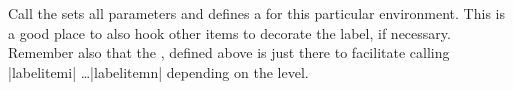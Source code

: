 Call the  sets all parameters and defines a   for this particular
environment. This is a good place to also hook other items to decorate the label, if necessary.
Remember also that the , defined above is just there to facilitate  
calling |labelitemi| \ldots |labelitemn| depending on the level.

    \begin{teX}
    \expandafter
    \list
      \csname\@itemitem\endcsname
      {\def\makelabel##1{\hss\llap{##1}}}%
  \fi}
    \end{teX}

    \begin{teX}
\let\enditemize =\endlist
    \end{teX}




